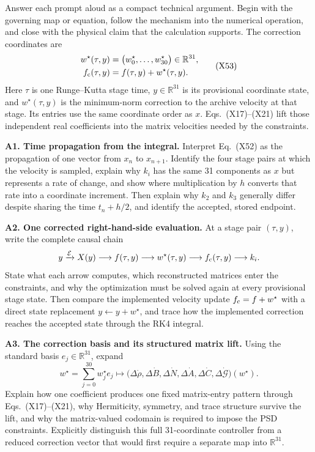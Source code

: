 \documentclass[10pt,letterpaper,twocolumn]{article}
\newcommand{\R}{\mathbb R}
\newcommand{\segmenthead}[1]{%
  \Needspace{5\baselineskip}%
  \par\medskip{\color{navy}\large\bfseries #1}\par
  \vspace{-2pt}{\color{navy}\rule{\columnwidth}{0.7pt}}\par\smallskip
}
\begin{document}
\segmenthead{P. Advisor-Defense Transfer and Repair}

Answer each prompt aloud as a compact technical argument.  Begin with the
governing map or equation, follow the mechanism into the numerical operation,
and close with the physical claim that the calculation supports.  The
correction coordinates are
\[
\begin{aligned}
w^\star(\tau,y)
&=\bigl(w_0^\star,\ldots,w_{30}^\star\bigr)\in\R^{31},\\
f_{\rm c}(\tau,y)
&=f(\tau,y)+w^\star(\tau,y).
\end{aligned}
\tag{X53}
\]
Here \(\tau\) is one Runge--Kutta stage time, \(y\in\R^{31}\) is its
provisional coordinate state, and \(w^\star(\tau,y)\) is the minimum-norm
correction to the archive velocity at that stage.  Its entries use the same
coordinate order as \(x\).  Eqs.~(X17)--(X21) lift those independent real
coefficients into the matrix velocities needed by the constraints.

\textbf{A1. Time propagation from the integral.}
Interpret Eq.~(X52) as the propagation of one vector from \(x_n\) to
\(x_{n+1}\).  Identify the four stage pairs at which the velocity is sampled,
explain why \(k_i\) has the same 31 components as \(x\) but represents a rate
of change, and show where multiplication by \(h\) converts that rate into a
coordinate increment.  Then explain why \(k_2\) and \(k_3\) generally differ
despite sharing the time \(t_n+h/2\), and identify the accepted, stored
endpoint.

\textbf{A2. One corrected right-hand-side evaluation.}
At a stage pair \((\tau,y)\), write the complete causal chain
\[
y\xrightarrow{\mathcal E}X(y)
\longrightarrow f(\tau,y)
\longrightarrow w^\star(\tau,y)
\longrightarrow f_{\rm c}(\tau,y)
\longrightarrow k_i.
\]
State what each arrow computes, which reconstructed matrices enter the
constraints, and why the optimization must be solved again at every
provisional stage state.  Then compare the implemented velocity update
\(f_{\rm c}=f+w^\star\) with a direct state replacement
\(y\leftarrow y+w^\star\), and trace how the implemented correction reaches
the accepted state through the RK4 integral.

\textbf{A3. The correction basis and its structured matrix lift.}
Using the standard basis \(e_j\in\R^{31}\), expand
\[
w^\star=\sum_{j=0}^{30}w_j^\star e_j
\longmapsto
\bigl(\Delta\dot\rho,\Delta\dot B,\Delta\dot N,
\Delta\dot A,\Delta\dot C,\Delta\dot{\mathcal G}\bigr)(w^\star).
\]
Explain how one coefficient produces one fixed matrix-entry pattern through
Eqs.~(X17)--(X21), why Hermiticity, symmetry, and trace structure survive the
lift, and why the matrix-valued codomain is required to impose the PSD
constraints.  Explicitly distinguish this full 31-coordinate controller from
a reduced correction vector that would first require a separate map into
\(\R^{31}\).
\end{document}
